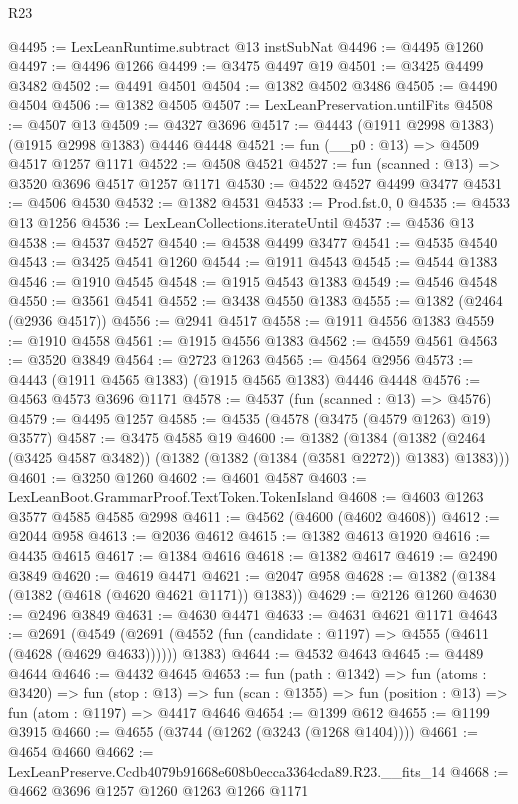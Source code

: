 \begin{lexlean}{R23}
\begin{coremodule}
@4495 := LexLeanRuntime.subtract @13 instSubNat
@4496 := @4495 @1260
@4497 := @4496 @1266
@4499 := @3475 @4497 @19
@4501 := @3425 @4499 @3482
@4502 := @4491 @4501
@4504 := @1382 @4502 @3486
@4505 := @4490 @4504
@4506 := @1382 @4505
@4507 := LexLeanPreservation.untilFits
@4508 := @4507 @13
@4509 := @4327 @3696
@4517 := @4443 (@1911 @2998 @1383) (@1915 @2998 @1383) @4446 @4448
@4521 := fun (__p0 : @13) => @4509 @4517 @1257 @1171
@4522 := @4508 @4521
@4527 := fun (scanned : @13) => @3520 @3696 @4517 @1257 @1171
@4530 := @4522 @4527 @4499 @3477
@4531 := @4506 @4530
@4532 := @1382 @4531
@4533 := Prod.fst.{0, 0}
@4535 := @4533 @13 @1256
@4536 := LexLeanCollections.iterateUntil
@4537 := @4536 @13
@4538 := @4537 @4527
@4540 := @4538 @4499 @3477
@4541 := @4535 @4540
@4543 := @3425 @4541 @1260
@4544 := @1911 @4543
@4545 := @4544 @1383
@4546 := @1910 @4545
@4548 := @1915 @4543 @1383
@4549 := @4546 @4548
@4550 := @3561 @4541
@4552 := @3438 @4550 @1383
@4555 := @1382 (@2464 (@2936 @4517))
@4556 := @2941 @4517
@4558 := @1911 @4556 @1383
@4559 := @1910 @4558
@4561 := @1915 @4556 @1383
@4562 := @4559 @4561
@4563 := @3520 @3849
@4564 := @2723 @1263
@4565 := @4564 @2956
@4573 := @4443 (@1911 @4565 @1383) (@1915 @4565 @1383) @4446 @4448
@4576 := @4563 @4573 @3696 @1171
@4578 := @4537 (fun (scanned : @13) => @4576)
@4579 := @4495 @1257
@4585 := @4535 (@4578 (@3475 (@4579 @1263) @19) @3577)
@4587 := @3475 @4585 @19
@4600 := @1382
    (@1384 (@1382 (@2464 (@3425 @4587 @3482)) (@1382 (@1382 (@1384 (@3581 @2272)) @1383) @1383)))
@4601 := @3250 @1260
@4602 := @4601 @4587
@4603 := LexLeanBoot.GrammarProof.TextToken.TokenIsland
@4608 := @4603 @1263 @3577 @4585 @4585 @2998
@4611 := @4562 (@4600 (@4602 @4608))
@4612 := @2044 @958
@4613 := @2036 @4612
@4615 := @1382 @4613 @1920
@4616 := @4435 @4615
@4617 := @1384 @4616
@4618 := @1382 @4617
@4619 := @2490 @3849
@4620 := @4619 @4471
@4621 := @2047 @958
@4628 := @1382 (@1384 (@1382 (@4618 (@4620 @4621 @1171)) @1383))
@4629 := @2126 @1260
@4630 := @2496 @3849
@4631 := @4630 @4471
@4633 := @4631 @4621 @1171
@4643 := @2691
    (@4549 (@2691 (@4552 (fun (candidate : @1197) => @4555 (@4611 (@4628 (@4629 @4633)))))) @1383)
@4644 := @4532 @4643
@4645 := @4489 @4644
@4646 := @4432 @4645
@4653 := fun (path : @1342) =>
  fun (atoms : @3420) =>
  fun (stop : @13) =>
  fun (scan : @1355) => fun (position : @13) => fun (atom : @1197) => @4417 @4646
@4654 := @1399 @612
@4655 := @1199 @3915
@4660 := @4655 (@3744 (@1262 (@3243 (@1268 @1404))))
@4661 := @4654 @4660
@4662 := LexLeanPreserve.Ccdb4079b91668e608b0ecca3364cda89.R23.__fits_14
@4668 := @4662 @3696 @1257 @1260 @1263 @1266 @1171

\end{coremodule}
\end{lexlean}
